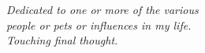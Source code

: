 \chapter*{~}

\begin{center}
\textit{Dedicated to one or more of the various\\
people or pets or influences in my life.\\
Touching final thought.\\[36pt]}
\end{center}